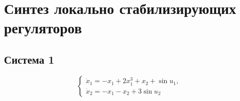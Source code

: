 \section{Синтез локально стабилизирующих регуляторов}


\subsection{Система 1}

\begin{equation}
  \begin{cases}
    \dot x_1=-x_1+2x_1^3+x_2+\sin u_1,\\
    \dot x_2=-x_1-x_2+3\sin u_2
  \end{cases}
  \label{eq:controlled-system-1}
\end{equation}

